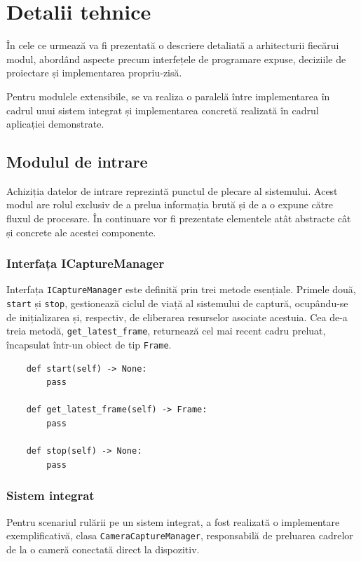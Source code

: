 \section{Detalii tehnice}
\indent\par
În cele ce urmează va fi prezentată o descriere detaliată a arhitecturii fiecărui modul, abordând aspecte precum interfețele de programare expuse, deciziile de proiectare și implementarea propriu-zisă.

Pentru modulele extensibile, se va realiza o paralelă între implementarea în cadrul unui sistem integrat și implementarea concretă realizată în cadrul aplicației demonstrate.

\subsection{Modulul de intrare}
\indent\par
Achiziția datelor de intrare reprezintă punctul de plecare al sistemului. Acest modul are rolul exclusiv de a prelua informația brută și de a o expune către fluxul de procesare. În continuare vor fi prezentate elementele atât abstracte cât și concrete ale acestei componente.

\subsubsection{Interfața ICaptureManager}
\indent\par
Interfața \texttt{ICaptureManager} este definită prin trei metode esențiale. Primele două, \texttt{start} și \texttt{stop}, gestionează ciclul de viață al sistemului de captură, ocupându-se de inițializarea și, respectiv, de eliberarea resurselor asociate acestuia. Cea de-a treia metodă, \texttt{get\_latest\_frame}, returnează cel mai recent cadru preluat, încapsulat într-un obiect de tip \texttt{Frame}.
\begin{verbatim}
    def start(self) -> None:
        pass

    def get_latest_frame(self) -> Frame:
        pass

    def stop(self) -> None:
        pass
\end{verbatim}

\subsubsection{Sistem integrat}
\indent\par
Pentru scenariul rulării pe un sistem integrat, a fost realizată o implementare exemplificativă, clasa \texttt{CameraCaptureManager}, responsabilă de preluarea cadrelor de la o cameră conectată direct la dispozitiv.

